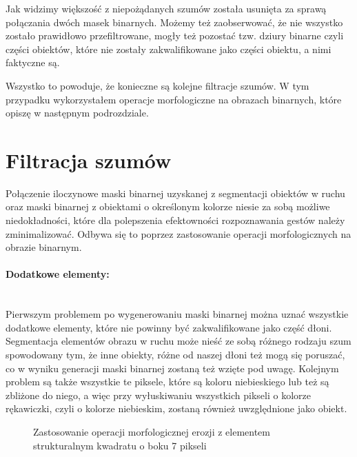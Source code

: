 \documentclass[a4paper,12pt,twoside,openany]{report}
\newcommand{\ImgPath}{.}
\begin{document}
Jak widzimy większość z niepożądanych szumów została usunięta za sprawą połączania dwóch masek binarnych. Możemy też zaobserwować, że nie wszystko zostało prawidłowo przefiltrowane, mogły też pozostać tzw. dziury binarne czyli części obiektów, które nie zostały zakwalifikowane jako części obiektu, a nimi faktyczne są. 

Wszystko to powoduje, że konieczne są kolejne filtracje szumów. W tym przypadku wykorzystałem operacje morfologiczne na obrazach binarnych, które opiszę w następnym podrozdziale.  

\section{Filtracja szumów}
Połączenie iloczynowe maski binarnej uzyskanej z segmentacji obiektów w ruchu oraz maski binarnej z obiektami o określonym kolorze niesie za sobą możliwe niedokładności, które dla polepszenia efektowności rozpoznawania gestów należy zminimalizować. Odbywa się to poprzez zastosowanie operacji morfologicznych na obrazie binarnym. 

\paragraph{Dodatkowe elementy:} \mbox{} \\
\indent
Pierwszym problemem po wygenerowaniu maski binarnej można uznać wszystkie dodatkowe elementy, które nie powinny być zakwalifikowane jako część dłoni. Segmentacja elementów obrazu w ruchu może nieść ze sobą różnego rodzaju szum spowodowany tym, że inne obiekty, różne od naszej dłoni też mogą się poruszać, co w wyniku generacji maski binarnej zostaną też wzięte pod uwagę. Kolejnym problem są także wszystkie te piksele, które są koloru niebieskiego lub też są zbliżone do niego, a więc przy wyłuskiwaniu wszystkich pikseli o kolorze rękawiczki, czyli o kolorze niebieskim, zostaną również uwzględnione jako obiekt.
 
\begin{figure}[H]
	\centering
	\caption{Zastosowanie operacji morfologicznej erozji z elementem strukturalnym kwadratu o boku 7 pikseli}
\end{figure}
\end{document}
